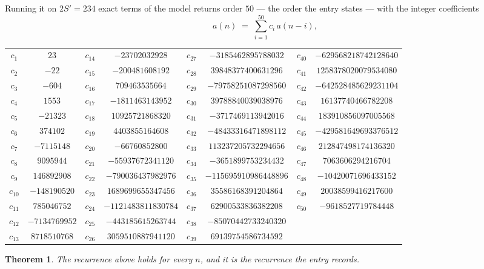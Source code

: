\documentclass[11pt,a4paper]{article}
\theoremstyle{plain}
\newtheorem{theorem}{Theorem}
\theoremstyle{definition}
\begin{document}
Running it on $2S'=234$ exact terms of the model returns order $50$ --- the order the
entry states --- with the integer coefficients
\[
a(n)\;=\;\sum_{i=1}^{50}c_i\,a(n-i),
\]
\begin{center}\small
\begin{tabular}{cccccccc}
$c_{1}$ & $23$ & $c_{14}$ & $-23702032928$ & $c_{27}$ & $-3185462895788032$ & $c_{40}$ & $-629568218742128640$ \\
$c_{2}$ & $-22$ & $c_{15}$ & $-200481608192$ & $c_{28}$ & $39848377400631296$ & $c_{41}$ & $1258378020079534080$ \\
$c_{3}$ & $-604$ & $c_{16}$ & $709463535664$ & $c_{29}$ & $-79758251087298560$ & $c_{42}$ & $-642528485629231104$ \\
$c_{4}$ & $1553$ & $c_{17}$ & $-1811463143952$ & $c_{30}$ & $39788840039038976$ & $c_{43}$ & $16137740466782208$ \\
$c_{5}$ & $-21323$ & $c_{18}$ & $10925721868320$ & $c_{31}$ & $-3717469113942016$ & $c_{44}$ & $183910856097005568$ \\
$c_{6}$ & $374102$ & $c_{19}$ & $4403855164608$ & $c_{32}$ & $-48433316471898112$ & $c_{45}$ & $-429581649693376512$ \\
$c_{7}$ & $-7115148$ & $c_{20}$ & $-66760852800$ & $c_{33}$ & $113237205732294656$ & $c_{46}$ & $212847498174136320$ \\
$c_{8}$ & $9095944$ & $c_{21}$ & $-55937672341120$ & $c_{34}$ & $-3651899753234432$ & $c_{47}$ & $7063606294216704$ \\
$c_{9}$ & $146892908$ & $c_{22}$ & $-790036437982976$ & $c_{35}$ & $-115695910986448896$ & $c_{48}$ & $-10420071696433152$ \\
$c_{10}$ & $-148190520$ & $c_{23}$ & $1689699655347456$ & $c_{36}$ & $35586168391204864$ & $c_{49}$ & $20038599416217600$ \\
$c_{11}$ & $785046752$ & $c_{24}$ & $-1121483811830784$ & $c_{37}$ & $62900533836382208$ & $c_{50}$ & $-9618527719784448$ \\
$c_{12}$ & $-7134769952$ & $c_{25}$ & $-443185615263744$ & $c_{38}$ & $-85070442733240320$ &  &  \\
$c_{13}$ & $8718510768$ & $c_{26}$ & $3059510887941120$ & $c_{39}$ & $69139754586734592$ &  &  \\
\end{tabular}
\end{center}

\begin{theorem}
The recurrence above holds for every $n$, and it is the recurrence the entry records.
\end{theorem}
\end{document}
